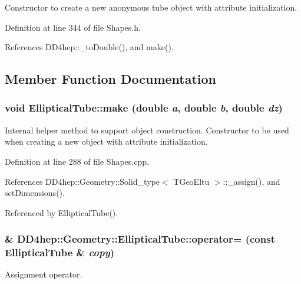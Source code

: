 Constructor to create a new anonymous tube object with attribute initialization. 

Definition at line 344 of file Shapes.h.

References DD4hep::\_\-toDouble(), and make().

\subsection{Member Function Documentation}
\hypertarget{class_d_d4hep_1_1_geometry_1_1_elliptical_tube_a33fcff3b6382c727153417bb115bacb9}{
\subsubsection[{make}]{\setlength{\rightskip}{0pt plus 5cm}void EllipticalTube::make (double {\em a}, \/  double {\em b}, \/  double {\em dz})}}
\label{class_d_d4hep_1_1_geometry_1_1_elliptical_tube_a33fcff3b6382c727153417bb115bacb9}


Internal helper method to support object construction. Constructor to be used when creating a new object with attribute initialization. 

Definition at line 288 of file Shapes.cpp.

References DD4hep::Geometry::Solid\_\-type$<$ TGeoEltu $>$::\_\-assign(), and setDimensions().

Referenced by EllipticalTube().\hypertarget{class_d_d4hep_1_1_geometry_1_1_elliptical_tube_a4488c10cca4a3d2f44757f86da62124e}{
\subsubsection[{operator=}]{\& DD4hep::Geometry::EllipticalTube::operator= (const {\bf EllipticalTube} \& {\em copy})}}
\label{class_d_d4hep_1_1_geometry_1_1_elliptical_tube_a4488c10cca4a3d2f44757f86da62124e}


Assignment operator. 

